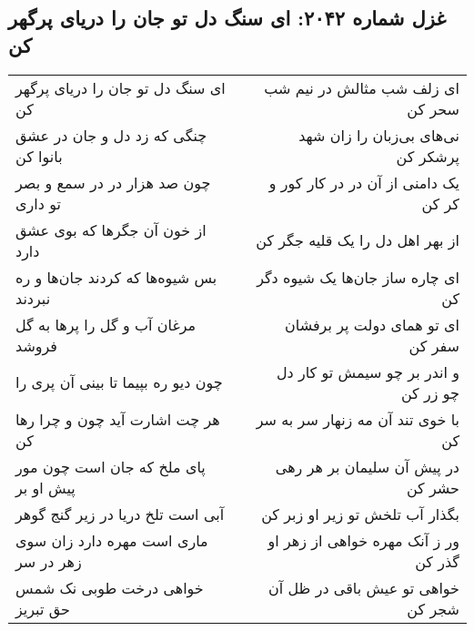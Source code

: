 \begin{center}
\section*{غزل شماره ۲۰۴۲: ای سنگ دل تو جان را دریای پرگهر کن}
\label{sec:2042}
\begin{longtable}{l p{0.5cm} r}
ای سنگ دل تو جان را دریای پرگهر کن
&&
ای زلف شب مثالش در نیم شب سحر کن
\\
چنگی که زد دل و جان در عشق بانوا کن
&&
نی‌های بی‌زبان را زان شهد پرشکر کن
\\
چون صد هزار در در سمع و بصر تو داری
&&
یک دامنی از آن در در کار کور و کر کن
\\
از خون آن جگرها که بوی عشق دارد
&&
از بهر اهل دل را یک قلیه جگر کن
\\
بس شیوه‌ها که کردند جان‌ها و ره نبردند
&&
ای چاره ساز جان‌ها یک شیوه دگر کن
\\
مرغان آب و گل را پرها به گل فروشد
&&
ای تو همای دولت پر برفشان سفر کن
\\
چون دیو ره بپیما تا بینی آن پری را
&&
و اندر بر چو سیمش تو کار دل چو زر کن
\\
هر چت اشارت آید چون و چرا رها کن
&&
با خوی تند آن مه زنهار سر به سر کن
\\
پای ملخ که جان است چون مور پیش او بر
&&
در پیش آن سلیمان بر هر رهی حشر کن
\\
آبی است تلخ دریا در زیر گنج گوهر
&&
بگذار آب تلخش تو زیر او زبر کن
\\
ماری است مهره دارد زان سوی زهر در سر
&&
ور ز آنک مهره خواهی از زهر او گذر کن
\\
خواهی درخت طوبی نک شمس حق تبریز
&&
خواهی تو عیش باقی در ظل آن شجر کن
\\
\end{longtable}
\end{center}
